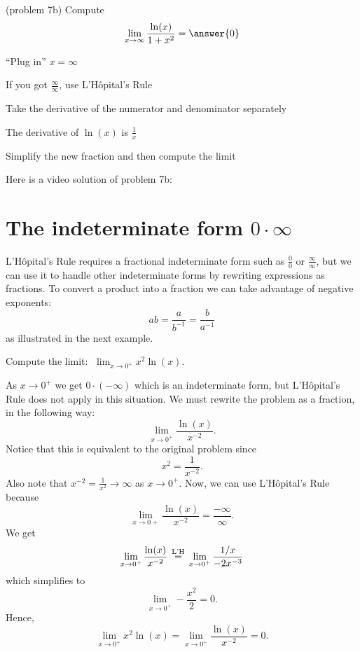\documentclass[handout]{ximera}
\begin{document}
\begin{problem}(problem 7b)
  Compute
  \[
  \lim_{x \to \infty} \frac{\ln(x)}{1 + x^2} = \answer{0}
  \]
  
    \begin{hint}
      ``Plug in'' $x=\infty$
    \end{hint}
    \begin{hint}
      If you got $\frac{\infty}{\infty}$, use L'H\^{o}pital's Rule
    \end{hint}
    \begin{hint}
      Take the derivative of the numerator and denominator separately
    \end{hint}
		\begin{hint}
		  The derivative of $\ln(x)$ is $\frac{1}{x}$
	  \end{hint}
		\begin{hint}
      Simplify the new fraction and then compute the limit
    \end{hint}
	
\end{problem}

Here is a video solution of  problem 7b:
\begin{foldable}
\end{foldable}


\section{The indeterminate form $0 \cdot \infty$}

L'H\^{o}pital's Rule requires a fractional indeterminate form such as $\frac00$ or $\frac{\infty}{\infty}$, 
but we can use it to handle other indeterminate forms by rewriting expressions as fractions. 
To convert a product into a fraction we can take advantage of negative exponents:
\[ab = \frac{a}{b^{-1}} = \frac{b}{a^{-1}}\]
as illustrated in the next example.

\begin{example}[example 8]
Compute the limit:  $\displaystyle{\;\lim_{x \to 0^+}x^2 \ln(x)}$.

As $x\to 0^+$ we get $0 \cdot (-\infty)$ which is an indeterminate form, but L'H\^{o}pital's Rule does not apply in this situation.
We must rewrite the problem as a fraction, in the following way:
\[\lim_{x \to 0^+}\frac{\ln(x)}{x^{-2}}.\]
Notice that this is equivalent to the original problem since 
\[x^2 = \frac{1}{x^{-2}}.\]
Also note that $x^{-2} =\frac{1}{x^2} \to \infty$ as $x\to 0^+$.
Now, we can use L'H\^{o}pital's Rule because 
\[\lim_{x \to 0+}\frac{\ln(x)}{x^{-2}}= \frac{-\infty}{\infty}.\]
We get
\[\lim_{x \to 0^+}\frac{\ln(x)}{x^{-2}}\,\overset{\scriptsize\text{L'H}}{=}\, \lim_{x\to 0^+} \frac{1/x}{-2x^{-3}}\]
which simplifies to
\[\lim_{x \to 0^+}-\frac{x^2}{2}= 0.\]
Hence, 
\[\lim_{x \to 0^+} x^2 \ln(x)=\lim_{x \to 0^+}\frac{\ln(x)}{x^{-2}}= 0.\]
\end{example}
\end{document}
